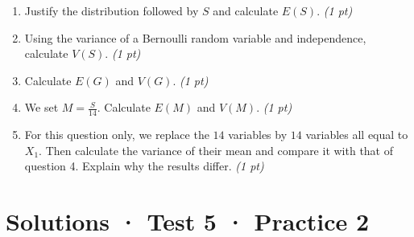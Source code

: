 \begin{enumerate}

\item Justify the distribution followed by $S$ and calculate $E(S)$. \hfill\textit{(1 pt)}

\item Using the variance of a Bernoulli random variable and independence, calculate $V(S)$. \hfill\textit{(1 pt)}

\item Calculate $E(G)$ and $V(G)$. \hfill\textit{(1 pt)}

\item We set $M=\frac S{14}$. Calculate $E(M)$ and $V(M)$. \hfill\textit{(1 pt)}

\item For this question only, we replace the $14$ variables by $14$ variables all equal to $X_1$. Then calculate the variance of their mean and compare it with that of question 4. Explain why the results differ. \hfill\textit{(1 pt)}

\end{enumerate}

\ifprof\clearpage

\section*{Solutions · Test 5 · Practice 2}\label{cor:7-2}

